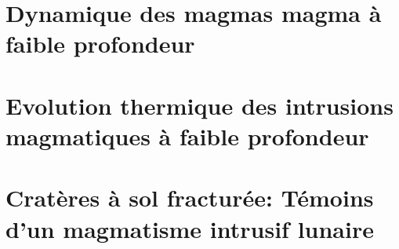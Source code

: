 \documentclass[a4paper,12pt,twoside]{ThesisStyle}
\begin{document}


\dominitoc
\setcounter{tocdepth}{2}


\cleardoublepage



\cleardoublepage

\tableofcontents

\mainmatter

\setcounter{chapter}{-1}
\pagestyle{empty}



\part{Dynamique des magmas magma à faible profondeur}
\pagestyle{fancy}




\part{Evolution   thermique  des   intrusions  magmatiques   à faible
  profondeur}




\part{Cratères à  sol  fracturée: Témoins  d'un  magmatisme  intrusif
  lunaire}





% 



% 
% 

% 

% 
% 
\end{document}
